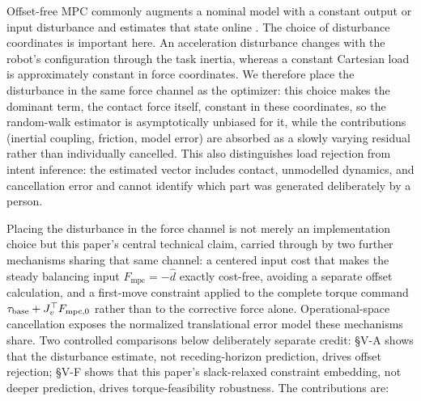 \documentclass[conference]{IEEEtran}
\newcommand{\Fmpc}{F_{\mathrm{mpc}}}
\newcommand{\dhat}{\hat d}
\begin{document}
Offset-free MPC commonly augments a nominal model with a constant output or
input disturbance and estimates that state online
\cite{pannocchia2003disturbance}. The choice of disturbance coordinates is
important here. An acceleration disturbance changes with the robot's
configuration through the task inertia, whereas a constant Cartesian load is
approximately constant in force coordinates. We therefore place the
disturbance in the same force channel as the optimizer: this choice makes the
dominant term, the contact force itself, constant in these coordinates, so
the random-walk estimator is asymptotically unbiased for it, while the
contributions (inertial coupling, friction, model error)
are absorbed as a slowly varying residual rather than individually
cancelled. This also distinguishes
load rejection from intent inference: the estimated vector includes contact,
unmodelled dynamics, and cancellation error and cannot identify which part was
generated deliberately by a person.

Placing the disturbance in the force channel is not merely an implementation
choice but this paper's central technical claim, carried through by two
further mechanisms sharing that same channel: a centered input cost that
makes the steady balancing input $\Fmpc=-\dhat$ exactly cost-free, avoiding a
separate offset calculation, and a first-move constraint applied to the
complete torque command $\tau_{\rm base}+J_v^\top F_{\mathrm{mpc},0}$ rather
than to the corrective force alone. Operational-space cancellation exposes
the normalized translational error model these mechanisms share. Two
controlled comparisons below deliberately separate credit: \S V-A shows
that the disturbance estimate, not receding-horizon prediction, drives
offset rejection; \S V-F shows that this paper's slack-relaxed constraint
embedding, not deeper prediction, drives torque-feasibility robustness.
The contributions are:
\end{document}
